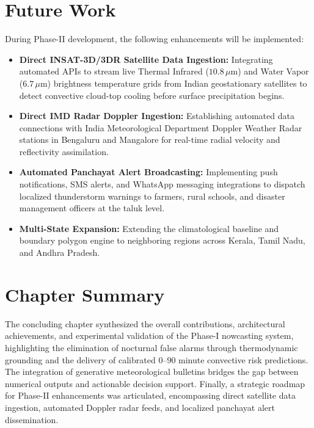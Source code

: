 \documentclass[12pt,a4paper]{report}
\begin{document}
\section{Future Work}
During Phase-II development, the following enhancements will be implemented:
\begin{itemize}[leftmargin=*]
    \item \textbf{Direct INSAT-3D/3DR Satellite Data Ingestion:} Integrating automated APIs to stream live Thermal Infrared ($10.8\,\mu\text{m}$) and Water Vapor ($6.7\,\mu\text{m}$) brightness temperature grids from Indian geostationary satellites to detect convective cloud-top cooling before surface precipitation begins.
    \item \textbf{Direct IMD Radar Doppler Ingestion:} Establishing automated data connections with India Meteorological Department Doppler Weather Radar stations in Bengaluru and Mangalore for real-time radial velocity and reflectivity assimilation.
    \item \textbf{Automated Panchayat Alert Broadcasting:} Implementing push notifications, SMS alerts, and WhatsApp messaging integrations to dispatch localized thunderstorm warnings to farmers, rural schools, and disaster management officers at the taluk level.
    \item \textbf{Multi-State Expansion:} Extending the climatological baseline and boundary polygon engine to neighboring regions across Kerala, Tamil Nadu, and Andhra Pradesh.
\end{itemize}

\section{Chapter Summary}
The concluding chapter synthesized the overall contributions, architectural achievements, and experimental validation of the Phase-I nowcasting system, highlighting the elimination of nocturnal false alarms through thermodynamic grounding and the delivery of calibrated $0$--$90$ minute convective risk predictions. The integration of generative meteorological bulletins bridges the gap between numerical outputs and actionable decision support. Finally, a strategic roadmap for Phase-II enhancements was articulated, encompassing direct satellite data ingestion, automated Doppler radar feeds, and localized panchayat alert dissemination.
\end{document}
